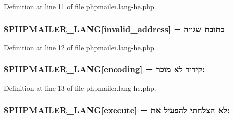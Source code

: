 Definition at line 11 of file phpmailer.\+lang-\/he.\+php.

\subsubsection[{\texorpdfstring{\$\+P\+H\+P\+M\+A\+I\+L\+E\+R\+\_\+\+L\+A\+NG}{$PHPMAILER_LANG}}]{\setlength{\rightskip}{0pt plus 5cm}\$P\+H\+P\+M\+A\+I\+L\+E\+R\+\_\+\+L\+A\+NG\mbox{[}\textquotesingle{}invalid\+\_\+address\textquotesingle{}\mbox{]} = \textquotesingle{}כתובת שגויה\textquotesingle{}}\hypertarget{phpmailer_8lang-he_8php_a42d61bcea4c79599ecb44fd062f54d47}{}\label{phpmailer_8lang-he_8php_a42d61bcea4c79599ecb44fd062f54d47}


Definition at line 12 of file phpmailer.\+lang-\/he.\+php.

\subsubsection[{\texorpdfstring{\$\+P\+H\+P\+M\+A\+I\+L\+E\+R\+\_\+\+L\+A\+NG}{$PHPMAILER_LANG}}]{\setlength{\rightskip}{0pt plus 5cm}\$P\+H\+P\+M\+A\+I\+L\+E\+R\+\_\+\+L\+A\+NG\mbox{[}\textquotesingle{}encoding\textquotesingle{}\mbox{]} = \textquotesingle{}קידוד לא מוכר\+: \textquotesingle{}}\hypertarget{phpmailer_8lang-he_8php_a817f7283f3d54c970a0c10305cc668cc}{}\label{phpmailer_8lang-he_8php_a817f7283f3d54c970a0c10305cc668cc}


Definition at line 13 of file phpmailer.\+lang-\/he.\+php.

\subsubsection[{\texorpdfstring{\$\+P\+H\+P\+M\+A\+I\+L\+E\+R\+\_\+\+L\+A\+NG}{$PHPMAILER_LANG}}]{\setlength{\rightskip}{0pt plus 5cm}\$P\+H\+P\+M\+A\+I\+L\+E\+R\+\_\+\+L\+A\+NG\mbox{[}\textquotesingle{}execute\textquotesingle{}\mbox{]} = \textquotesingle{}לא הצלחתי להפעיל את\+: \textquotesingle{}}\hypertarget{phpmailer_8lang-he_8php_a668217a9563a168f30f2a8548b6ed5a9}{}\label{phpmailer_8lang-he_8php_a668217a9563a168f30f2a8548b6ed5a9}


